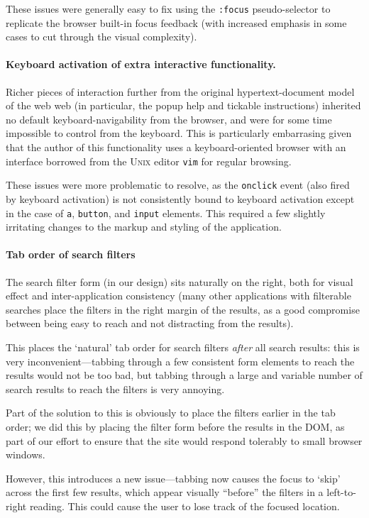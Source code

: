 These issues were generally easy to fix using the \verb!:focus!
  pseudo-selector to replicate the browser built-in focus feedback
  (with increased emphasis in some cases to cut through the visual
  complexity).

\paragraph{Keyboard activation of extra interactive functionality.}
Richer pieces of interaction further from the original
hypertext-document model of the web web (in particular, the popup help
and tickable instructions) inherited no default keyboard-navigability
from the browser, and were for some time impossible to control from
the keyboard. This is particularly embarrasing given that the author
of this functionality uses a keyboard-oriented browser with an
interface borrowed from the \textsc{Unix} editor \verb!vim! for
regular browsing.

These issues were more problematic to resolve, as the \verb!onclick!
  event (also fired by keyboard activation) is not consistently bound
  to keyboard activation except in the case of \verb!a!,
  \verb!button!, and \verb!input! elements. This required a few
  slightly irritating changes to the markup and styling of the
  application.

\paragraph{Tab order of search filters}
The search filter form (in our design) sits naturally on the right,
both for visual effect and inter-application consistency (many other
applications with filterable searches place the filters in the right
margin of the results, as a good compromise between being easy to
reach and not distracting from the results).

This places the `natural' tab order for search filters \emph{after}
all search results: this is very inconvenient---tabbing through a few
consistent form elements to reach the results would not be too bad,
but tabbing through a large and variable number of search results to
reach the filters is very annoying.

Part of the solution to this is obviously to place the filters earlier
in the tab order; we did this by placing the filter form before the
results in the DOM, as part of our effort to ensure that the site
would respond tolerably to small browser windows.

However, this introduces a new issue---tabbing now causes the focus to
`skip' across the first few results, which appear visually ``before''
the filters in a left-to-right reading. This could cause the user to
lose track of the focused location.


